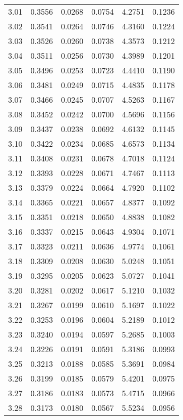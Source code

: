 \documentclass{article}
\begin{document}
\begin{longtable}{cccccc}
3.01 & 0.3556 & 0.0268 & 0.0754 & 4.2751 & 0.1236 \\
3.02 & 0.3541 & 0.0264 & 0.0746 & 4.3160 & 0.1224 \\
3.03 & 0.3526 & 0.0260 & 0.0738 & 4.3573 & 0.1212 \\
3.04 & 0.3511 & 0.0256 & 0.0730 & 4.3989 & 0.1201 \\
3.05 & 0.3496 & 0.0253 & 0.0723 & 4.4410 & 0.1190 \\
3.06 & 0.3481 & 0.0249 & 0.0715 & 4.4835 & 0.1178 \\
3.07 & 0.3466 & 0.0245 & 0.0707 & 4.5263 & 0.1167 \\
3.08 & 0.3452 & 0.0242 & 0.0700 & 4.5696 & 0.1156 \\
3.09 & 0.3437 & 0.0238 & 0.0692 & 4.6132 & 0.1145 \\
3.10 & 0.3422 & 0.0234 & 0.0685 & 4.6573 & 0.1134 \\
3.11 & 0.3408 & 0.0231 & 0.0678 & 4.7018 & 0.1124 \\
3.12 & 0.3393 & 0.0228 & 0.0671 & 4.7467 & 0.1113 \\
3.13 & 0.3379 & 0.0224 & 0.0664 & 4.7920 & 0.1102 \\
3.14 & 0.3365 & 0.0221 & 0.0657 & 4.8377 & 0.1092 \\
3.15 & 0.3351 & 0.0218 & 0.0650 & 4.8838 & 0.1082 \\
3.16 & 0.3337 & 0.0215 & 0.0643 & 4.9304 & 0.1071 \\
3.17 & 0.3323 & 0.0211 & 0.0636 & 4.9774 & 0.1061 \\
3.18 & 0.3309 & 0.0208 & 0.0630 & 5.0248 & 0.1051 \\
3.19 & 0.3295 & 0.0205 & 0.0623 & 5.0727 & 0.1041 \\
3.20 & 0.3281 & 0.0202 & 0.0617 & 5.1210 & 0.1032 \\
3.21 & 0.3267 & 0.0199 & 0.0610 & 5.1697 & 0.1022 \\
3.22 & 0.3253 & 0.0196 & 0.0604 & 5.2189 & 0.1012 \\
3.23 & 0.3240 & 0.0194 & 0.0597 & 5.2685 & 0.1003 \\
3.24 & 0.3226 & 0.0191 & 0.0591 & 5.3186 & 0.0993 \\
3.25 & 0.3213 & 0.0188 & 0.0585 & 5.3691 & 0.0984 \\
3.26 & 0.3199 & 0.0185 & 0.0579 & 5.4201 & 0.0975 \\
3.27 & 0.3186 & 0.0183 & 0.0573 & 5.4715 & 0.0966 \\
3.28 & 0.3173 & 0.0180 & 0.0567 & 5.5234 & 0.0956 \\

\end{longtable}
\end{document}
